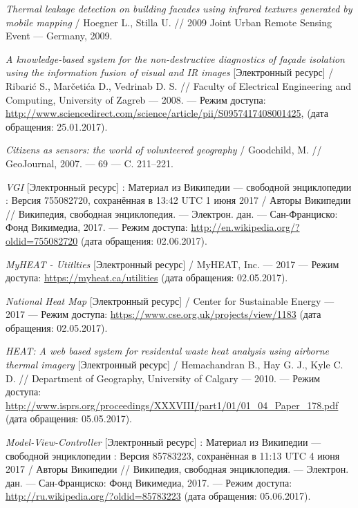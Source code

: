 \begin{thebibliography}{00}
	\emph{Thermal leakage detection on building facades using infrared textures generated by mobile mapping} / Hoegner L., Stilla U. //
	2009 Joint Urban Remote Sensing Event --- Germany, 2009.

	\emph{A knowledge-based system for the non-destructive diagnostics of façade isolation using the information fusion of visual and IR images} [Электронный ресурс] / Ribarić S., Marčetića D., Vedrinab D. S. // Faculty of Electrical Engineering and Computing, University of Zagreb --- 2008. --- Режим доступа: \url{http://www.sciencedirect.com/science/article/pii/S0957417408001425}, (дата обращения: 25.01.2017).

	\emph{Citizens as sensors: the world of volunteered geography} / Goodchild, M. // GeoJournal, 2007. --- \No{} 69 --- C. 211–221.

	\emph{VGI} [Электронный ресурс] : Материал из Википедии — свободной энциклопедии : Версия 755082720, сохранённая в 13:42 UTC 1 июня 2017 / Авторы Википедии // Википедия, свободная энциклопедия. — Электрон. дан. — Сан-Франциско: Фонд Викимедиа, 2017. — Режим доступа: \url{http://en.wikipedia.org/?oldid=755082720} (дата обращения: 02.06.2017).

	\emph{MyHEAT - Utitlties} [Электронный ресурс] / MyHEAT, Inc. --- 2017 --- Режим доступа: \url{https://myheat.ca/utilities} (дата обращения: 02.05.2017).

	\emph{National Heat Map} [Электронный ресурс] / Center for Sustainable Energy --- 2017 ---  Режим доступа: \url{https://www.cse.org.uk/projects/view/1183} (дата обращения: 02.05.2017).

	\emph{HEAT: A web based system for residental waste heat analysis using airborne thermal imagery} [Электронный ресурс] / Hemachandran B., Hay G. J., Kyle C. D. // Department of Geography, University of Calgary --- 2010. --- Режим доступа: \url{http://www.isprs.org/proceedings/XXXVIII/part1/01/01_04_Paper_178.pdf} (дата обращения: 05.05.2017).

	\emph{Model-View-Controller} [Электронный ресурс] : Материал из Википедии — свободной энциклопедии : Версия 85783223, сохранённая в 11:13 UTC 4 июня 2017 / Авторы Википедии // Википедия, свободная энциклопедия. — Электрон. дан. — Сан-Франциско: Фонд Викимедиа, 2017. — Режим доступа: \url{http://ru.wikipedia.org/?oldid=85783223} (дата обращения: 05.06.2017).


\end{thebibliography}
